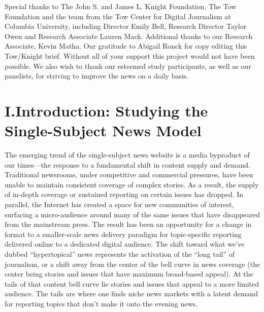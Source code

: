 Special thanks to The John S. and James L. Knight Foundation, The Tow Foundation
and the team from the Tow Center for Digital Journalism at Columbia University,
including Director Emily Bell, Research Director Taylor Owen and Research
Associate Lauren Mack. Additional thanks to our Research Associate, Kevin Matha.
Our gratitude to Abigail Ronck for copy editing this Tow/Knight brief. Without all
of your support this project would not have been possible. We also wish to thank our
esteemed study participants, as well as our panelists, for striving to improve the news
on a daily basis.

\chapter{I.Introduction: Studying the Single-Subject News Model}
The emerging trend of the single-subject news website is a media byproduct
of our times—the response to a fundamental shift in content supply
and demand. Traditional newsrooms, under competitive and commercial
pressures, have been unable to maintain consistent coverage of complex
stories. As a result, the supply of in-depth coverage or sustained reporting
on certain issues has dropped. In parallel, the Internet has created a space
for new communities of interest, surfacing a micro-audience around many
of the same issues that have disappeared from the mainstream press. The
result has been an opportunity for a change in format to a smaller-scale
news delivery paradigm for topic-specific reporting delivered online to a
dedicated digital audience.
The shift toward what we’ve dubbed ``hypertopical'' news represents the
activation of the ``long tail'' of journalism, or a shift away from the center
of the bell curve in news coverage (the center being stories and issues that
have maximum broad-based appeal). At the tails of that content bell curve
lie stories and issues that appeal to a more limited audience. The tails are
where one finds niche news markets with a latent demand for reporting
topics that don’t make it onto the evening news.

